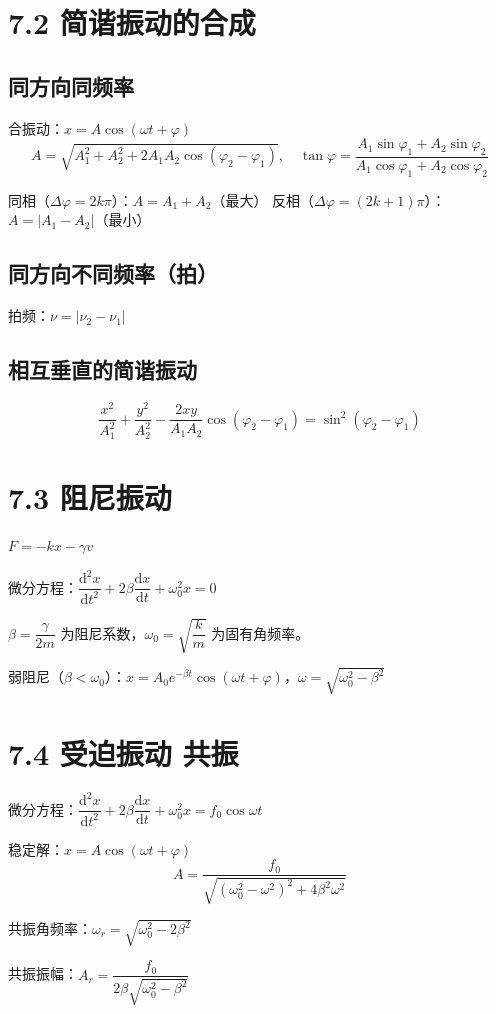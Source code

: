 \documentclass{ctexart}
\begin{document}
\section*{7.2 简谐振动的合成}

\subsection*{同方向同频率}
合振动：$x = A\cos(\omega t + \varphi)$
\[
A = \sqrt{A_1^{2} + A_2^{2} + 2A_1A_2\cos(\varphi_2 - \varphi_1)},\quad
\tan\varphi = \frac{A_1\sin\varphi_1 + A_2\sin\varphi_2}{A_1\cos\varphi_1 + A_2\cos\varphi_2}
\]

同相（$\Delta\varphi = 2k\pi$）：$A = A_1 + A_2$（最大）
反相（$\Delta\varphi = (2k+1)\pi$）：$A = |A_1 - A_2|$（最小）

\subsection*{同方向不同频率（拍）}
拍频：$\nu = |\nu_2 - \nu_1|$

\subsection*{相互垂直的简谐振动}
\[
\frac{x^{2}}{A_1^{2}} + \frac{y^{2}}{A_2^{2}} - \frac{2xy}{A_1A_2}\cos(\varphi_2 - \varphi_1) = \sin^{2}(\varphi_2 - \varphi_1)
\]

\section*{7.3 阻尼振动}
$F = -kx - \gamma v$

微分方程：$\dfrac{\mathrm{d}^{2}x}{\mathrm{d}t^{2}} + 2\beta\dfrac{\mathrm{d}x}{\mathrm{d}t} + \omega_0^{2}x = 0$

$\beta = \dfrac{\gamma}{2m}$ 为阻尼系数，$\omega_0 = \sqrt{\dfrac{k}{m}}$ 为固有角频率。

弱阻尼（$\beta < \omega_0$）：$x = A_0 e^{-\beta t}\cos(\omega t + \varphi)$，$\omega = \sqrt{\omega_0^{2} - \beta^{2}}$

\section*{7.4 受迫振动 共振}
微分方程：$\dfrac{\mathrm{d}^{2}x}{\mathrm{d}t^{2}} + 2\beta\dfrac{\mathrm{d}x}{\mathrm{d}t} + \omega_0^{2}x = f_0\cos\omega t$

稳定解：$x = A\cos(\omega t + \varphi)$
\[
A = \frac{f_0}{\sqrt{(\omega_0^{2} - \omega^{2})^{2} + 4\beta^{2}\omega^{2}}}
\]

共振角频率：$\omega_r = \sqrt{\omega_0^{2} - 2\beta^{2}}$

共振振幅：$A_r = \dfrac{f_0}{2\beta\sqrt{\omega_0^{2} - \beta^{2}}}$
\end{document}
